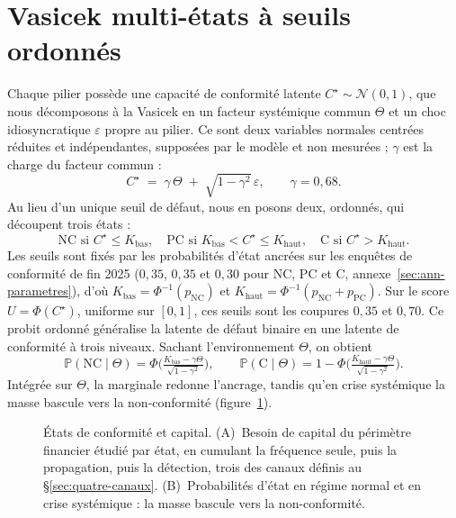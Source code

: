\section{Vasicek multi-états à seuils ordonnés}

Chaque pilier possède une capacité de conformité latente $C^\star\sim\mathcal N(0,1)$, que nous
décomposons à la Vasicek en un facteur systémique commun $\Theta$ et un choc idiosyncratique $\varepsilon$ propre au pilier. Ce sont deux variables normales centrées réduites et indépendantes, supposées par le modèle et non mesurées ; $\gamma$ est la charge du facteur commun :
\begin{equation}
C^\star \;=\; \gamma\,\Theta \;+\; \sqrt{1-\gamma^2}\,\varepsilon, \qquad \gamma=0{,}68.
\end{equation}
Au lieu d'un unique seuil de défaut, nous en posons deux, ordonnés, qui découpent trois
états :
\begin{equation}
\text{NC si } C^\star\le K_{\text{bas}}, \quad
\text{PC si } K_{\text{bas}}<C^\star\le K_{\text{haut}}, \quad
\text{C si } C^\star>K_{\text{haut}}.
\end{equation}
Les seuils sont fixés par les probabilités d'état ancrées sur les enquêtes de
conformité de fin 2025 ($0{,}35$, $0{,}35$ et $0{,}30$ pour NC, PC et C, annexe~\ref{sec:ann-parametres}), d'où $K_{\text{bas}}=\Phi^{-1}(p_{\text{NC}})$ et
$K_{\text{haut}}=\Phi^{-1}(p_{\text{NC}}+p_{\text{PC}})$. Sur le score $U=\Phi(C^\star)$, uniforme sur $[0,1]$, ces seuils sont les coupures $0{,}35$ et $0{,}70$. Ce probit ordonné généralise la latente
de défaut binaire en une latente de conformité à trois niveaux. Sachant l'environnement $\Theta$, on
obtient
\begin{equation}
\mathbb P(\text{NC}\mid\Theta)=\Phi\!\Big(\tfrac{K_{\text{bas}}-\gamma\Theta}{\sqrt{1-\gamma^2}}\Big),
\qquad
\mathbb P(\text{C}\mid\Theta)=1-\Phi\!\Big(\tfrac{K_{\text{haut}}-\gamma\Theta}{\sqrt{1-\gamma^2}}\Big).
\end{equation}
Intégrée sur $\Theta$, la marginale redonne l'ancrage, tandis qu'en crise systémique la masse bascule
vers la non-conformité (figure~\ref{fig:multietats-rapport}).

\begin{figure}[H]\centering
{}
\caption{États de conformité et capital. (A)~Besoin de capital du périmètre financier étudié par état, en cumulant la fréquence seule,
puis la propagation, puis la détection, trois des canaux définis au
\S\ref{sec:quatre-canaux}. (B)~Probabilités d'état en régime normal et en crise systémique : la
masse bascule vers la non-conformité.}
\label{fig:multietats-rapport}
\end{figure}

